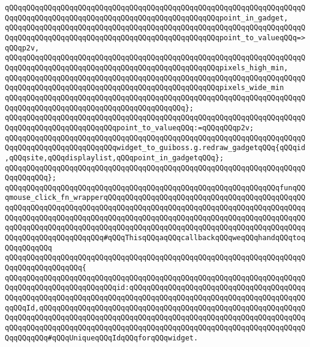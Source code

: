 \verb|qQQqqQQqqQQqqQQqqQQqqQQqqQQqqQQqqQQqqQQqqQQqqQQqqQQqqQQqqQQqqQQqqQQqqQQqqQQqqQQqqQQqqQQqqQQqqQQqqQQqqQQqqQQqqQQqqQQqqQQqpoint_in_gadget,|\newline
\verb|qQQqqQQqqQQqqQQqqQQqqQQqqQQqqQQqqQQqqQQqqQQqqQQqqQQqqQQqqQQqqQQqqQQqqQQqqQQqqQQqqQQqqQQqqQQqqQQqqQQqqQQqqQQqqQQqqQQqqQQqpoint_to_valueqQQq=>qQQqp2v,|\newline
\verb|qQQqqQQqqQQqqQQqqQQqqQQqqQQqqQQqqQQqqQQqqQQqqQQqqQQqqQQqqQQqqQQqqQQqqQQqqQQqqQQqqQQqqQQqqQQqqQQqqQQqqQQqqQQqqQQqqQQqqQQqpixels_high_min,|\newline
\verb|qQQqqQQqqQQqqQQqqQQqqQQqqQQqqQQqqQQqqQQqqQQqqQQqqQQqqQQqqQQqqQQqqQQqqQQqqQQqqQQqqQQqqQQqqQQqqQQqqQQqqQQqqQQqqQQqqQQqqQQqpixels_wide_min|\newline
\verb|qQQqqQQqqQQqqQQqqQQqqQQqqQQqqQQqqQQqqQQqqQQqqQQqqQQqqQQqqQQqqQQqqQQqqQQqqQQqqQQqqQQqqQQqqQQqqQQqqQQqqQQqqQQqqQQq};|\newline
\newline
\verb|qQQqqQQqqQQqqQQqqQQqqQQqqQQqqQQqqQQqqQQqqQQqqQQqqQQqqQQqqQQqqQQqqQQqqQQqqQQqqQQqqQQqqQQqqQQqqQQqpoint_to_valueqQQq:=qQQqqQQqp2v;|\newline
\newline
\verb|qQQqqQQqqQQqqQQqqQQqqQQqqQQqqQQqqQQqqQQqqQQqqQQqqQQqqQQqqQQqqQQqqQQqqQQqqQQqqQQqqQQqqQQqqQQqqQQqwidget_to_guiboss.g.redraw_gadgetqQQq{qQQqid,qQQqsite,qQQqdisplaylist,qQQqpoint_in_gadgetqQQq};|\newline
\verb|qQQqqQQqqQQqqQQqqQQqqQQqqQQqqQQqqQQqqQQqqQQqqQQqqQQqqQQqqQQqqQQqqQQqqQQqqQQqqQQq};|\newline
\newline
\newline
\verb|qQQqqQQqqQQqqQQqqQQqqQQqqQQqqQQqqQQqqQQqqQQqqQQqqQQqqQQqqQQqqQQqfunqQQqmouse_click_fn_wrapperqQQqqQQqqQQqqQQqqQQqqQQqqQQqqQQqqQQqqQQqqQQqqQQqqQQqqQQqqQQqqQQqqQQqqQQqqQQqqQQqqQQqqQQqqQQqqQQqqQQqqQQqqQQqqQQqqQQqqQQqqQQqqQQqqQQqqQQqqQQqqQQqqQQqqQQqqQQqqQQqqQQqqQQqqQQqqQQqqQQqqQQqqQQqqQQqqQQqqQQqqQQqqQQqqQQqqQQqqQQqqQQqqQQqqQQqqQQqqQQqqQQqqQQqqQQqqQQqqQQqqQQqqQQqqQQqqQQqqQQq#qQQqThisqQQqaqQQqcallbackqQQqweqQQqhandqQQqtoqQQqqQQqqQQq|\newline
\verb|qQQqqQQqqQQqqQQqqQQqqQQqqQQqqQQqqQQqqQQqqQQqqQQqqQQqqQQqqQQqqQQqqQQqqQQqqQQqqQQqqQQqqQQq{|\newline
\verb|qQQqqQQqqQQqqQQqqQQqqQQqqQQqqQQqqQQqqQQqqQQqqQQqqQQqqQQqqQQqqQQqqQQqqQQqqQQqqQQqqQQqqQQqqQQqqQQqid:qQQqqQQqqQQqqQQqqQQqqQQqqQQqqQQqqQQqqQQqqQQqqQQqqQQqqQQqqQQqqQQqqQQqqQQqqQQqqQQqqQQqqQQqqQQqqQQqqQQqqQQqqQQqqQQqqQQqId,qQQqqQQqqQQqqQQqqQQqqQQqqQQqqQQqqQQqqQQqqQQqqQQqqQQqqQQqqQQqqQQqqQQqqQQqqQQqqQQqqQQqqQQqqQQqqQQqqQQqqQQqqQQqqQQqqQQqqQQqqQQqqQQqqQQqqQQqqQQqqQQqqQQqqQQqqQQqqQQqqQQqqQQqqQQqqQQqqQQqqQQqqQQqqQQqqQQqqQQqqQQqqQQqqQQq#qQQqUniqueqQQqIdqQQqforqQQqwidget.|\newline
